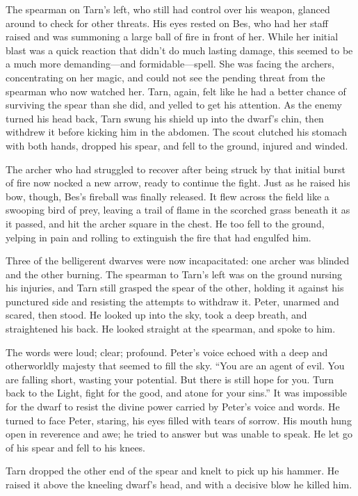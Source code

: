The spearman on Tarn's left, who still had control over his weapon, glanced around to check for other threats.  His eyes rested on Bes, who had her staff raised and was summoning a large ball of fire in front of her.  While her initial blast was a quick reaction that didn't do much lasting damage, this seemed to be a much more demanding---and formidable---spell.  She was facing the archers, concentrating on her magic, and could not see the pending threat from the spearman who now watched her.  Tarn, again, felt like he had a better chance of surviving the spear than she did, and yelled to get his attention.  As the enemy turned his head back, Tarn swung his shield up into the dwarf's chin, then withdrew it before kicking him in the abdomen.  The scout clutched his stomach with both hands, dropped his spear, and fell to the ground, injured and winded.

The archer who had struggled to recover after being struck by that initial burst of fire now nocked a new arrow, ready to continue the fight.  Just as he raised his bow, though, Bes's fireball was finally released.  It flew across the field like a swooping bird of prey, leaving a trail of flame in the scorched grass beneath it as it passed, and hit the archer square in the chest.  He too fell to the ground, yelping in pain and rolling to extinguish the fire that had engulfed him.

Three of the belligerent dwarves were now incapacitated: one archer was blinded and the other burning.  The spearman to Tarn's left was on the ground nursing his injuries, and Tarn still grasped the spear of the other, holding it against his punctured side and resisting the attempts to withdraw it.  Peter, unarmed and scared, then stood.  He looked up into the sky, took a deep breath, and straightened his back.  He looked straight at the spearman, and spoke to him.

The words were loud; clear; profound.  Peter's voice echoed with a deep and otherworldly majesty that seemed to fill the sky.   ``You are an agent of evil.  You are falling short, wasting your potential.  But there is still hope for you.  Turn back to the Light, fight for the good, and atone for your sins.'' It was impossible for the dwarf to resist the divine power carried by Peter's voice and words.  He turned to face Peter, staring, his eyes filled with tears of sorrow.  His mouth hung open in reverence and awe; he tried to answer but was unable to speak.  He let go of his spear and fell to his knees.

Tarn dropped the other end of the spear and knelt to pick up his hammer.  He raised it above the kneeling dwarf's head, and with a decisive blow he killed him.

